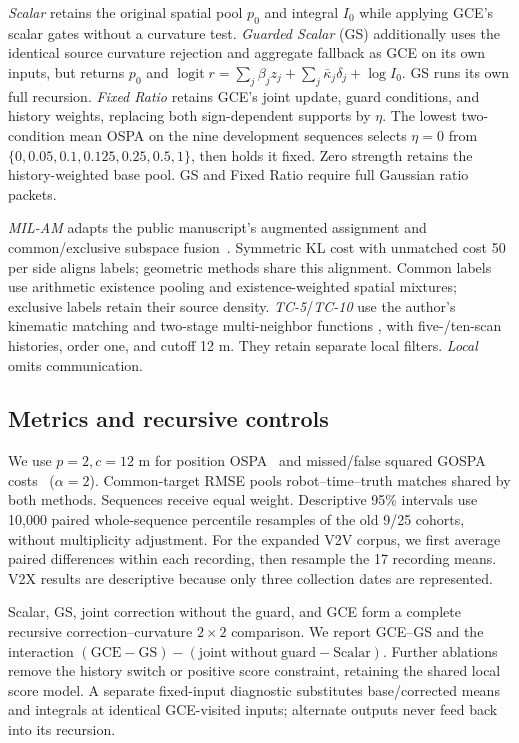 \emph{Scalar} retains the original spatial pool $p_0$ and integral $I_0$
while applying GCE's scalar gates without a curvature test.
\emph{Guarded Scalar} (GS) additionally uses the identical source
curvature rejection and aggregate fallback as GCE on its own inputs,
but returns $p_0$ and
$\operatorname{logit}r=\sum_j\beta_jz_j+
\sum_j\bar\kappa_j\delta_j+\log I_0$.
GS runs its own full recursion. \emph{Fixed Ratio} retains GCE's joint
update, guard conditions, and history weights, replacing both sign-dependent supports
by $\eta$. The lowest two-condition mean OSPA on the nine development
sequences selects $\eta=0$ from
$\{0,0.05,0.1,0.125,0.25,0.5,1\}$, then holds it fixed.
Zero strength retains the history-weighted base pool.
GS and Fixed Ratio require full Gaussian ratio packets.

\emph{MIL-AM} adapts the public manuscript's augmented assignment and
common/exclusive subspace fusion~\cite{gao2019milpreprint}.
Symmetric KL cost with unmatched cost 50 per side aligns labels;
geometric methods share this alignment. Common labels use arithmetic
existence pooling and existence-weighted spatial mixtures; exclusive
labels retain their source density. \emph{TC-5}/\emph{TC-10} use the
author's kinematic matching and two-stage multi-neighbor functions
\cite{nguyen2021tc}, with five-/ten-scan histories, order one, and cutoff
12 m. They retain separate local filters. \emph{Local} omits communication.

\subsection{Metrics and recursive controls}
We use $p=2,c=12$ m for position OSPA~\cite{schuhmacher2008ospa}
and missed/false squared GOSPA costs~\cite{gospa2017} ($\alpha=2$).
Common-target RMSE pools robot--time--truth matches shared by both
methods. Sequences receive equal weight. Descriptive 95\% intervals
use 10,000 paired whole-sequence percentile resamples of the old 9/25
cohorts, without multiplicity adjustment. For the expanded V2V corpus,
we first average paired differences within each recording, then resample
the 17 recording means. V2X results are descriptive because only three
collection dates are represented.

Scalar, GS, joint correction without the guard, and GCE form a complete
recursive correction--curvature $2\times2$ comparison. We report GCE--GS
and the interaction $(\mathrm{GCE}-\mathrm{GS})-
(\mathrm{joint\ without\ guard}-\mathrm{Scalar})$.
Further ablations remove the history switch or positive score constraint,
retaining the shared local score model. A separate fixed-input diagnostic
substitutes base/corrected means and integrals at identical GCE-visited
inputs; alternate outputs never feed back into its recursion.

